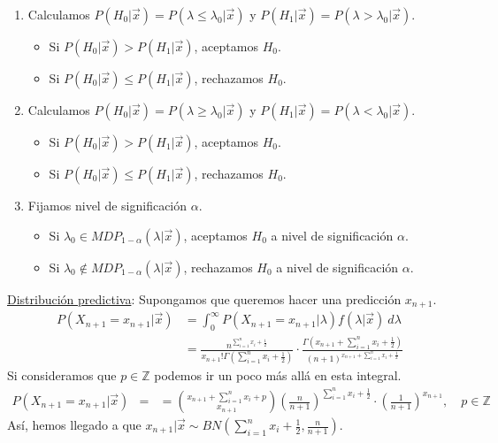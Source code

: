 \begin{enumerate}
    \item Calculamos $P(H_0 | \vec{x}) = P(\lambda \leq \lambda_0 |\vec{x})$ y $P(H_1 | \vec{x}) = P(\lambda > \lambda_0 | \vec{x})$.
          \begin{itemize}
              \item Si $P(H_0 | \vec{x}) > P(H_1 | \vec{x})$, aceptamos $H_0$.
              \item Si $P(H_0 | \vec{x}) \leq P(H_1 | \vec{x})$, rechazamos $H_0$.
          \end{itemize}
    \item Calculamos $P(H_0 | \vec{x}) = P(\lambda \ge \lambda_0 |\vec{x})$ y $P(H_1 | \vec{x}) = P(\lambda < \lambda_0 | \vec{x})$.
          \begin{itemize}
              \item Si $P(H_0 | \vec{x}) > P(H_1 | \vec{x})$, aceptamos $H_0$.
              \item Si $P(H_0 | \vec{x}) \leq P(H_1 | \vec{x})$, rechazamos $H_0$.
          \end{itemize}
    \item Fijamos nivel de significación $\alpha$.
          \begin{itemize}
              \item Si $\lambda_0 \in MDP_{1 - \alpha}(\lambda | \vec{x})$, aceptamos $H_0$ a nivel de significación $\alpha$.
              \item Si $\lambda_0 \not\in MDP_{1 - \alpha}(\lambda | \vec{x})$, rechazamos $H_0$ a nivel de significación $\alpha$.
          \end{itemize}
\end{enumerate}
\underline{Distribución predictiva}: Supongamos que queremos hacer una predicción $x_{n+1}$.
\begin{align*}
    P(X_{n+1} = x_{n+1} | \vec{x}) & = \int_{0}^{\infty} P(X_{n+1} = x_{n+1} | \lambda) f(\lambda | \vec{x}) \ d\lambda                                                                                                                                              \\
                                   & = \frac{n^{\sum_{i=1}^{n} x_i + \frac{1}{2}}}{x_{n+1}!\Gamma(\sum_{i=1}^{n} x_i + \frac{1}{2})} \cdot \frac{\Gamma\left( x_{n+1} + \sum_{i=1}^{n} x_i + \frac{1}{2}\right)}{(n+1)^{x_{n+1} + \sum_{i=1}^{n} x_i + \frac{1}{2}}}
\end{align*}
Si consideramos que $p \in \mathbb{Z}$ podemos ir un poco más allá en esta integral.
\begin{align*}
    P(X_{n+1} = x_{n+1} | \vec{x}) & =
                                   & = \binom{x_{n+1} + \sum_{i=1}^{n} x_i + p}{x_{n+1}}\left( \frac{n}{n+1}\right)^{\sum_{i=1}^{n} x_i + \frac{1}{2}} \cdot \left( \frac{1}{n+1}\right)^{x_{n+1}}, \quad p \in \mathbb{Z}
\end{align*}
Así, hemos llegado a que $x_{n+1} | \vec{x} \sim BN\left( \sum_{i=1}^{n} x_i + \frac{1}{2}, \frac{n}{n+1} \right)$.

